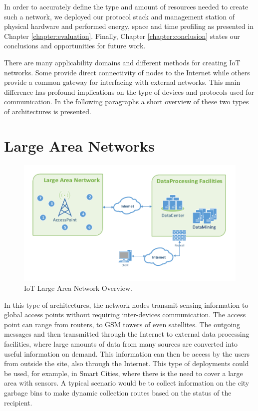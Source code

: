 	In order to accurately define the type and amount of resources needed to create such a network, we deployed our protocol stack and management station of physical hardware and performed energy, space and time profiling as presented in Chapter \ref{chapter:evaluation}. Finally, Chapter \ref{chapter:conclusion} states our conclusions and opportunities for future work.
	
	
There are many applicability domains and different methods for creating \gls{IoT} networks.
Some provide direct connectivity of nodes to the Internet while others provide a common gateway for interfacing with external networks. This main difference has profound implications on the type of devices and protocols used for communication. In the following paragraphs a short overview of these two types of architectures is presented.

\section{Large Area Networks}

\begin{figure}[h]
  \centering
  \includegraphics[width=0.85\linewidth]{figures/Network_Overview_Sparse.pdf}
  \caption{IoT Large Area Network Overview.}
  \label{fig:net_overview_large}
\end{figure}

In this type of architectures, the network nodes transmit sensing information to global access points without requiring inter-devices communication. The access point can range from routers, to GSM towers of even satellites. The outgoing messages and then transmitted through the Internet to external data processing facilities, where large amounts of data from many sources are converted into useful information on demand. This information can then be access by the users from outside the site, also through the Internet.
This type of deployments could be used, for example, in Smart Cities, where there is the need to cover a large area with sensors. A typical scenario would be to collect information on the city garbage bins to make dynamic collection routes based on the status of the recipient.
  

